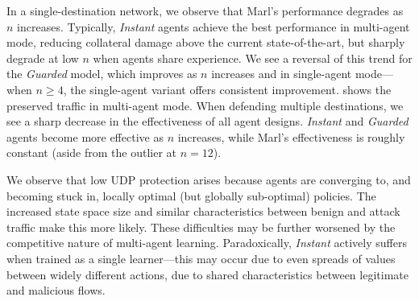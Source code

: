 \documentclass[10pt, times, conference, letterpaper]{IEEEtran}
\begin{document}
%	
%
%	
%
%	

In a single-destination network, we observe that Marl's performance degrades as $n$ increases.
Typically, \emph{Instant} agents achieve the best performance in multi-agent mode, reducing collateral damage above the current state-of-the-art, but sharply degrade at low $n$ when agents share experience.
We see a reversal of this trend for the \emph{Guarded} model, which improves as $n$ increases and in single-agent mode---when $n\ge4$, the single-agent variant offers consistent improvement.
 shows the preserved traffic in multi-agent mode.
When defending multiple destinations, we see a sharp decrease in the effectiveness of all agent designs.
\emph{Instant} and \emph{Guarded} agents become more effective as $n$ increases, while Marl's effectiveness is roughly constant (aside from the outlier at $n=12$).

We observe that low UDP protection arises because agents are converging to, and becoming stuck in, locally optimal (but globally sub-optimal) policies.
The increased state space size and similar characteristics between benign and attack traffic make this more likely.
These difficulties may be further worsened by the competitive nature of multi-agent learning.
Paradoxically, \emph{Instant} actively suffers when trained as a single learner---this may occur due to even spreads of values between widely different actions, due to shared characteristics between legitimate and malicious flows.
\end{document}
